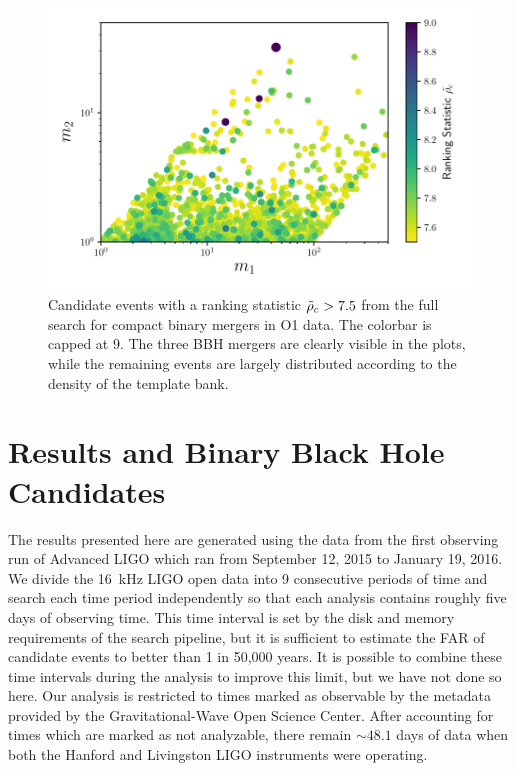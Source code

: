 \begin{figure}[]
  \centering
    \includegraphics[width=\columnwidth]{figs/chapter4/candidates.pdf}
\caption{Candidate events with a ranking statistic $\tilde{\rho}_c>7.5$ from the full search for compact binary mergers in O1 data. The colorbar is capped at 9. The three BBH mergers are clearly visible in the plots, while the remaining events are largely distributed according to the density 
of the template bank.}
\label{fig:bankcandidates}
\end{figure}

\section{Results and Binary Black Hole Candidates}\label{sec:results}
The results presented here are generated using the data from the first observing run of Advanced LIGO which ran from September 12, 2015 to January 19, 2016. We divide the 16~kHz LIGO open data into 9 consecutive periods of time and search each time period independently so that each analysis contains roughly five days of observing time. This time interval is set by the disk and memory requirements of the search pipeline, but it is sufficient to estimate the FAR of candidate events to better than 1 in 50,000 years. It is possible to combine these time intervals during the analysis to improve this limit, but we have not done so here. Our analysis is restricted to times marked as observable by the metadata provided by the Gravitational-Wave Open Science Center. After accounting for times which are marked as not analyzable, there remain $\sim48.1$ days of data when both the Hanford and Livingston LIGO instruments were operating.


